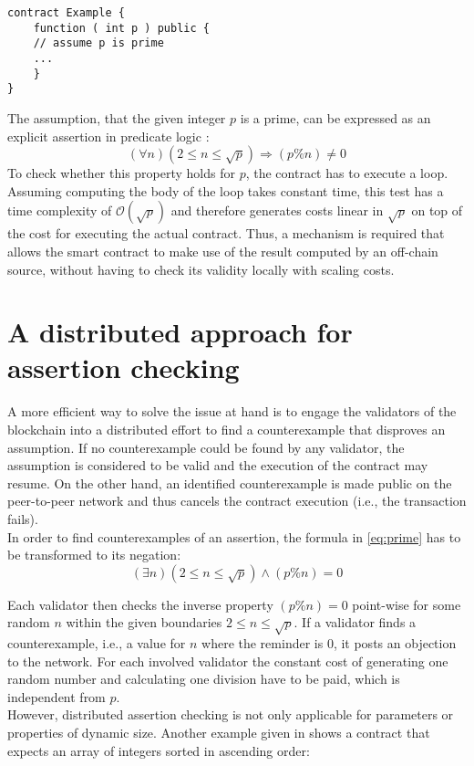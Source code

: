 \begin{lstlisting}[caption=Smart contract expecting a prime number \cite{thiemann_2020}, numbers=none, language=Solidity, label=lst:prime]
contract Example {
	function ( int p ) public {
	// assume p is prime
	...
	}
}
\end{lstlisting}
The assumption, that the given integer $p$ is a prime, can be expressed as an explicit assertion in predicate logic \cite{thiemann_2020}: 
\begin{equation}\label{eq:prime}
    (\forall n) (2 \le n \le \sqrt{p}) \Rightarrow (p \% n) \neq 0
\end{equation}
To check whether this property holds for $p$, the contract has to execute a loop. Assuming computing the body of the loop takes constant time, this test has a time complexity of $\mathcal{O}(\sqrt{p})$ and therefore generates costs linear in $\sqrt{p}$ on top of the cost for executing the actual contract. Thus, a mechanism is required that allows the smart contract to make use of the result computed by an off-chain source, without having to check its validity locally with scaling costs.

\section{A distributed approach for assertion checking}
A more efficient way to solve the issue at hand is to engage the validators of the blockchain into a distributed effort to find a counterexample that disproves an assumption. If no counterexample could be found by any validator, the assumption is considered to be valid and the execution of the contract may resume. On the other hand, an identified counterexample is made public on the peer-to-peer network and thus cancels the contract execution (i.e., the transaction fails). \\
In order to find counterexamples of an assertion, the formula in \ref{eq:prime} has to be transformed to its negation:
\begin{equation}\label{eq:prime_neg}
	(\exists n) (2 \le n \le \sqrt{p}) \wedge (p \% n) = 0
\end{equation}

Each validator then checks the inverse property $(p \% n) = 0$ point-wise for some random $n$ within the given boundaries $2 \le n \le \sqrt{p}$. If a validator finds a counterexample, i.e., a value for $n$ where the reminder is $0$, it posts an objection to the network. For each involved validator the constant cost of generating one random number and calculating one division have to be paid, which is independent from $p$. \\
However, distributed assertion checking is not only applicable for parameters or properties of dynamic size. Another example given in \cite{thiemann_2020} shows a contract that expects an array of integers sorted in ascending order: 

